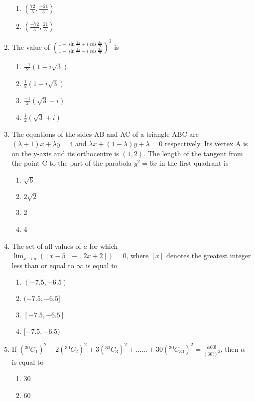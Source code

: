\documentclass[journal]{IEEEtran}
\begin{document}
\begin{enumerate}
\begin{enumerate}
    \item $ \left( \frac{72}{5},\frac{-21}{5} \right)$
    \item $ \left( \frac{-72}{5},\frac{21}{5} \right)$
\end{enumerate}
\item The value of $\left( \frac{1+\sin{\frac{2\pi}{9}}+i\cos{\frac{2\pi}{9}}}{1+\sin{\frac{2\pi}{9}}-i\cos{\frac{2\pi}{9}}} \right)^{3}$ is
\begin{enumerate}
    \item $\frac{-1}{2} (1-i\sqrt{3})$
    \item $ \frac{1}{2} (1-i\sqrt{3})$
    \item $ \frac{-1}{2} (\sqrt{3}-i) $
    \item $ \frac{1}{2} (\sqrt{3}+i) $
\end{enumerate}
\item The equations of the sides AB and AC of a triangle
ABC are \\
$(\lambda + 1) x + \lambda y = 4 $ and $ \lambda x + (1-\lambda) y + \lambda = 0$
 respectively. Its vertex A is on the y-axis and its
orthocentre is $(1, 2)$. The length of the tangent
from the point C to the part of the parabola $y^{2}
 = 6x$
in the first quadrant is 
\begin{enumerate}
    \item $\sqrt{6}$
    \item $2\sqrt{2}$
    \item 2
    \item 4
\end{enumerate}
\item The set of all values of $a$ for which \\
$\lim_{x \to a} ([x-5]-[2x+2])=0$, where $[x]$ denotes the greatest integer less than or equal to $\infty$ is equal to 
\begin{enumerate}
    \item $(-7.5, -6.5)$
    \item $(-7.5, -6.5] $
    \item $[-7.5, -6.5] $
    \item $[-7.5, -6.5) $
\end{enumerate}
\item If $ ({}^{30}C_{1})^{2} + 2({}^{30}C_{2})^{2} + 3({}^{30}C_{3})^{2} +......+ 30({}^{30}C_{30})^{2} = \frac{\alpha60!}{(30!)^{2}} $, then $\alpha$ is equal to 
\begin{enumerate}
    \item 30
    \item 60

\end{enumerate}
\end{enumerate}
\end{document}
